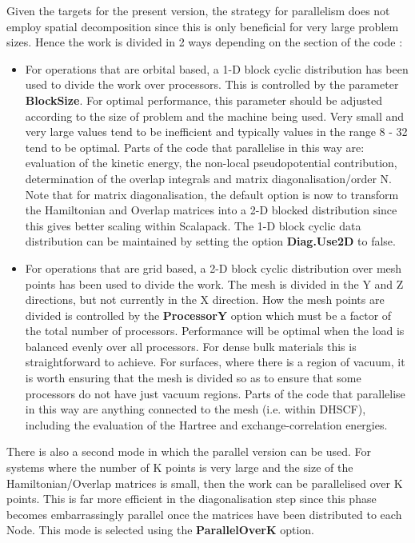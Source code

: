 \documentclass[11pt]{article}
\begin{document}
Given the targets for the present version, the strategy for parallelism
does not employ spatial decomposition since this is only beneficial for
very large problem sizes. Hence the work is divided in 2 ways depending
on the section of the code :

\begin{itemize}
\item
For operations that are orbital based, a 1-D block cyclic distribution
has been used to divide the work over processors. This is controlled
by the parameter {\bf BlockSize}.
For optimal performance, this parameter
should be adjusted according to the size of problem and the machine
being used. Very small and very large values tend to be inefficient
and typically values in the range 8 - 32 tend to be optimal. Parts of
the code that parallelise in this way are: evaluation of the kinetic
energy, the non-local pseudopotential contribution, determination of
the overlap integrals and matrix diagonalisation/order N. Note that
for matrix diagonalisation, the default option is now to transform the
Hamiltonian and Overlap matrices into a 2-D blocked distribution since
this gives better scaling within Scalapack. The 1-D block cyclic
data distribution can be maintained by setting the option {\bf Diag.Use2D}
to false.

\item
For operations that are grid based, a 2-D block cyclic distribution
over mesh points has been used to divide the work. The mesh is divided
in the Y and Z directions, but not currently in the X direction. How
the mesh points are divided is controlled by the {\bf ProcessorY}
option which must be a factor of the total number of processors.
Performance will be optimal when the load is balanced evenly
over all processors. For dense bulk materials this is straightforward
to achieve. For surfaces, where there is a region of vacuum, it is
worth ensuring that the mesh is divided so as to ensure that some
processors do not have just vacuum regions. Parts of the code that
parallelise in this way are anything connected to the mesh (i.e. within
DHSCF), including the evaluation of the Hartree and exchange-correlation
energies.
\end{itemize}

There is also a second mode in which the parallel version can be used. For
systems where the number of K points is very large and the size of the
Hamiltonian/Overlap matrices is small, then the work can be parallelised
over K points. This is far more efficient in the diagonalisation step
since this phase becomes embarrassingly parallel once the matrices have
been distributed to each Node. This mode is selected using the
{\bf ParallelOverK} 
option.
\end{document}
